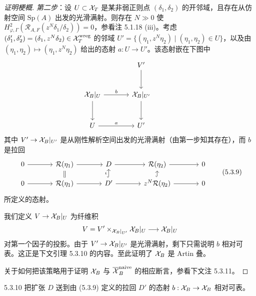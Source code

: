 \begin{proof}[证明梗概]
\emph{第二步}：设 $U\subset\mathcal{X}_T$ 是某非弱正则点 $(\delta_1,\delta_2)$ 的开邻域，且存在从仿射空间 $\mathrm{Sp}(A)$ 出发的光滑满射。则存在 $N\gg0$ 使 $H^2_{\varphi,\Gamma}(\mathcal R_{A,F}(z^N\delta_1/\delta_2))=0$，参看注 5.1.18 (iii)。考虑 $(\delta'_1,\delta'_2)=(\delta_1,z^N\delta_2)\in\mathcal{X}_T^{\mathrm{wreg}}$ 的邻域 $U'=\{(\eta_1,z^N\eta_2)\mid(\eta_1,\eta_2)\in U\}$，以及由 $(\eta_1,\eta_2)\mapsto(\eta_1,z^N\eta_2)$ 给出的态射 $a:U\to U'$。该态射嵌在下图中
\[
\begin{tikzcd}[row sep=large,column sep=large]
 & V'\arrow[d] & \\
 \XX_B|_U\arrow[r,"b"]\arrow[d] & \XX_B|_{U'}\arrow[d] & \\
 U\arrow[r,"a"] & U' &
\end{tikzcd}
\]
其中 $V'\to\mathcal{X}_B|_{U'}$ 是从刚性解析空间出发的光滑满射（由第一步知其存在），而 $b$ 是拉回
\begin{equation}
\begin{tikzcd}[column sep=large,row sep=small]
0\arrow[r] & \mathcal R(\eta_1)\arrow[r]\arrow[d,equal] & D\arrow[r] & \mathcal R(\eta_2)\arrow[r] & 0\\
0\arrow[r] & \mathcal R(\eta_1)\arrow[r] & D'\arrow[r]\arrow[u,hook,"\iota"] & z^N\mathcal R(\eta_2)\arrow[r]\arrow[u,hook] & 0
\end{tikzcd}\tag{5.3.9}
\end{equation}
所定义的态射。

我们定义 $V\to\mathcal{X}_B|_U$ 为纤维积
\[
V=V'\times_{\mathcal{X}_B|_{U'}}\mathcal{X}_B|_U\longrightarrow\mathcal{X}_B|_U
\]
对第一个因子的投影。由于 $V'\to\mathcal{X}_B|_{U'}$ 是光滑满射，剩下只需说明 $b$ 相对可表。这正是下文引理 5.3.10 的内容。至此证明了 $\mathcal{X}_B$ 是 Artin 叠。


关于如何把该策略用于证明 $\mathcal{X}_B$ 与 $\overline{\mathcal{X}}_B^{\mathrm{naive}}$ 的相应断言，参看下文注 5.3.11。
\end{proof}

\begin{lem}{5.3.10}\label{lem:a4-5-3-10}
把扩张 $D$ 送到由 (5.3.9) 定义的拉回 $D'$ 的态射 $b:\mathcal{X}_B\to\mathcal{X}_B$ 相对可表。
\end{lem}


